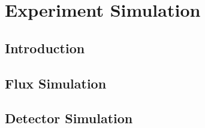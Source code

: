 \chapter{Experiment Simulation}

\section{Introduction}

\section{Flux Simulation}

\section{Detector Simulation}
